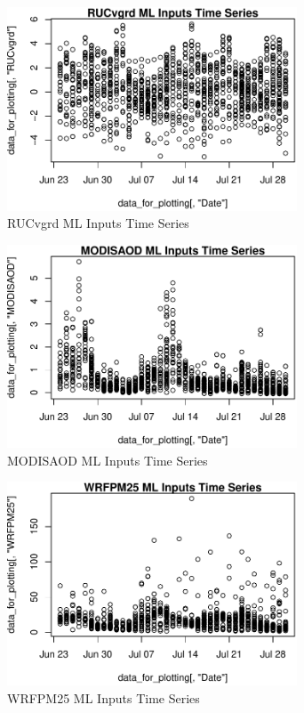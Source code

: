 \begin{figure} 
\centering  
\includegraphics[width=0.77\textwidth]{Code_Outputs/ML_input_report_AllforCaret_cleaned_StepPractice_part_practice_RUCvgrdTS.pdf} 
\caption{\label{fig:ML_input_report_AllforCaret_cleaned_StepPractice_part_practiceRUCvgrdTS}RUCvgrd ML Inputs Time Series} 
\end{figure} 
 

\begin{figure} 
\centering  
\includegraphics[width=0.77\textwidth]{Code_Outputs/ML_input_report_AllforCaret_cleaned_StepPractice_part_practice_MODISAODTS.pdf} 
\caption{\label{fig:ML_input_report_AllforCaret_cleaned_StepPractice_part_practiceMODISAODTS}MODISAOD ML Inputs Time Series} 
\end{figure} 
 

\begin{figure} 
\centering  
\includegraphics[width=0.77\textwidth]{Code_Outputs/ML_input_report_AllforCaret_cleaned_StepPractice_part_practice_WRFPM25TS.pdf} 
\caption{\label{fig:ML_input_report_AllforCaret_cleaned_StepPractice_part_practiceWRFPM25TS}WRFPM25 ML Inputs Time Series} 
\end{figure} 
 

